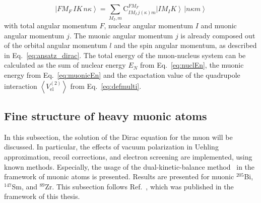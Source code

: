 \begin{equation}
\label{eq:totalState}
\left| FM_F\,IK\,n\kappa\right> = \sum_{M_I, m}\text{C}^{FM_F}_{IM_I\,j(\kappa)m}\left|IM_IK\right>\,\left|n\kappa m\right>
\end{equation}
with total angular momentum $F$, nuclear angular momentum $I$ and muonic angular momentum $j$. The muonic angular momentum $j$ is already composed out of the orbital angular momentum $l$ and the spin angular momentum, as described in Eq.~\eqref{eq:ansatz_dirac}. The total energy of the muon-nucleus system can be calculated as the sum of nuclear energy $E_N$ from Eq.~\eqref{eq:nuclEn}, the muonic energy from Eq.~\eqref{eq:muonicEn} and the expactation value of the quadrupole interaction $\left<V_{\text{el}}^{(2)}\right>$ from Eq.~\eqref{eq:defmulti}.

\subsection{Fine structure of heavy muonic atoms}
\label{sec:muon_finestructure}
In this subsection, the solution of the Dirac equation for the muon will be discussed. In particular, the effects of vacuum polarization in Uehling approximation, recoil corrections, and electron screening are implemented, using known methods. Especially, the usage of the dual-kinetic-balance method~\cite{Shabaev2004} in the framework of muonic atoms is presented. Results are presented for muonic $^{205}$Bi, $^{147}$Sm, and $^{89}$Zr. This subsection follows Ref.~\cite{michel2017}, which was published in the framework of this thesis. 


